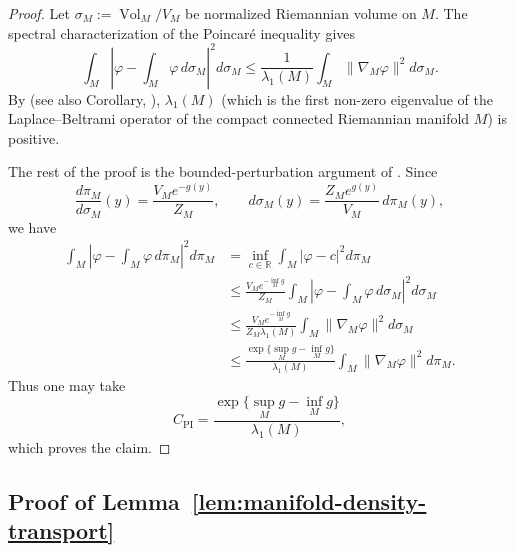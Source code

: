 \documentclass{article}
\newcommand{\R}{\mathbb R}
\newcommand{\Vol}{\operatorname{Vol}}
\numberwithin{equation}{section}
\begin{document}
\begin{proof}
Let $\sigma_M:=\Vol_M/V_M$ be normalized Riemannian volume on $M$.
The spectral characterization of the Poincar\'e inequality gives
\begin{equation}
 \int_M\left|\varphi-\int_M\varphi\,d\sigma_M\right|^2d\sigma_M
 \le \frac{1}{\lambda_1(M)}
 \int_M\|\nabla_M\varphi\|^2d\sigma_M.
\label{eq:volume-poincare}
\end{equation}
By \cite{cheeger1970lower} (see also Corollary, \cite{yau1975isoperimetric}), $\lambda_1(M)$ (which is the first non-zero eigenvalue of the Laplace--Beltrami operator of the compact connected Riemannian manifold $M$) is positive.


The rest of the proof is the bounded-perturbation argument of
\citet{holley1987logarithmic}. Since
\[
 \frac{d\pi_M}{d\sigma_M}(y)=\frac{V_Me^{-g(y)}}{Z_M},
 \qquad
 d\sigma_M(y)=\frac{Z_Me^{g(y)}}{V_M}\,d\pi_M(y),
\]
we have
\begin{align*}
 \int_M\left|\varphi-\int_M\varphi\,d\pi_M\right|^2d\pi_M
 &=\inf_{c\in\R}\int_M|\varphi-c|^2d\pi_M\\
 &\le \frac{V_Me^{-\inf_Mg}}{Z_M}
       \int_M\left|\varphi-\int_M\varphi\,d\sigma_M\right|^2
       d\sigma_M\\
 &\le \frac{V_Me^{-\inf_Mg}}{Z_M\lambda_1(M)}
       \int_M\|\nabla_M\varphi\|^2d\sigma_M\\
 &\le \frac{\exp\{\sup_Mg-\inf_Mg\}}{\lambda_1(M)}
       \int_M\|\nabla_M\varphi\|^2d\pi_M.
\end{align*}
Thus one may take
\[
 C_{\mathrm{PI}}
 =\frac{\exp\{\sup_Mg-\inf_Mg\}}{\lambda_1(M)},
\]
which proves the claim.
\end{proof}



\subsection{Proof of Lemma~\ref{lem:manifold-density-transport}}
\end{document}
